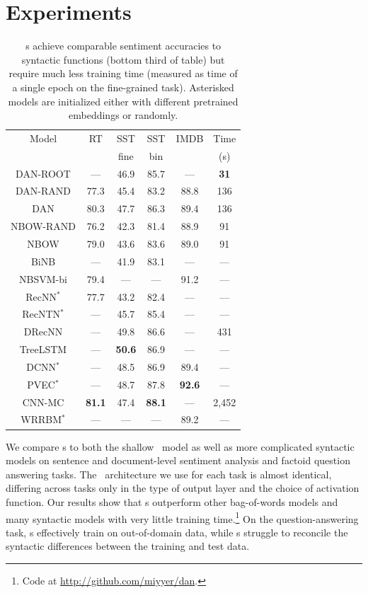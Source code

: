 
\section{Experiments}
\label{sec:experiments}


\begin{table}
\footnotesize
\begin{tabular}{cccccc}
\toprule
Model & RT & SST & SST & IMDB & Time \\
& & fine & bin & & (s)\\
\midrule
\footnotesize DAN-ROOT & --- & 46.9 & 85.7 & --- & \bf 31\\
\footnotesize DAN-RAND & 77.3 & 45.4 & 83.2 & 88.8 & 136\\
\footnotesize DAN & 80.3 & 47.7 & 86.3 & 89.4 & 136\\
\midrule
\footnotesize NBOW-RAND & 76.2 & 42.3 & 81.4 & 88.9 & 91 \\
\footnotesize NBOW & 79.0 & 43.6 & 83.6 & 89.0 & 91 \\
\footnotesize BiNB & --- & 41.9 & 83.1 & --- & ---\\
\footnotesize NBSVM-bi & 79.4 & --- & --- & 91.2 & ---\\
\midrule
\footnotesize RecNN$^*$ & 77.7 & 43.2 & 82.4 & --- & --- \\
\footnotesize RecNTN$^*$ & --- & 45.7 & 85.4 & --- & --- \\
\footnotesize DRecNN & --- & 49.8 & 86.6 & --- & 431\\
\footnotesize TreeLSTM & --- & \bf 50.6 & 86.9 & --- & --- \\
\footnotesize DCNN$^*$ & --- & 48.5 & 86.9 & 89.4 & ---\\
\footnotesize PVEC$^*$ & --- & 48.7 & 87.8 & \bf 92.6 & --- \\
\footnotesize CNN-MC & \bf 81.1 & 47.4 & \bf 88.1 & --- & 2,452 \\
\footnotesize WRRBM$^*$ & --- & --- & --- & 89.2 & ---\\
\bottomrule
\end{tabular}
\caption{\dan s achieve comparable sentiment accuracies to syntactic functions (bottom third of table) but require much less training time (measured as time of a single epoch on the  fine-grained task). Asterisked models are initialized either with different pretrained embeddings or randomly.}

\label{table:sentiment}
\end{table}

We compare \dan s to both the shallow \nbow\ model as well as more complicated
syntactic models on sentence and document-level sentiment analysis and factoid
question answering tasks. The \dan\ architecture we use for each task is almost
identical, differing across tasks only in the type of output layer and the
choice of activation function. Our results show that \dan s outperform other
bag-of-words models and many syntactic models with very little training
time.\footnote{Code at \url{http://github.com/miyyer/dan}.} On the
question-answering task, \dan s effectively
train on out-of-domain data, while \recnn s struggle to reconcile the syntactic
differences between the training and test data.

